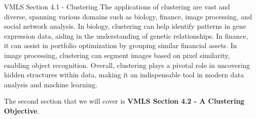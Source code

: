 \begin{notes}{VMLS Section 4.1 - Clustering}
    The applications of clustering are vast and diverse, spanning various domains such as biology, finance, image processing, and social network analysis. In biology, clustering can help identify 
    patterns in gene expression data, aiding in the understanding of genetic relationships. In finance, it can assist in portfolio optimization by grouping similar financial assets. In image processing, 
    clustering can segment images based on pixel similarity, enabling object recognition. Overall, clustering plays a pivotal role in uncovering hidden structures within data, making it an indispensable 
    tool in modern data analysis and machine learning.
\end{notes}

The second section that we will cover is \textbf{VMLS Section 4.2 - A Clustering Objective}.

